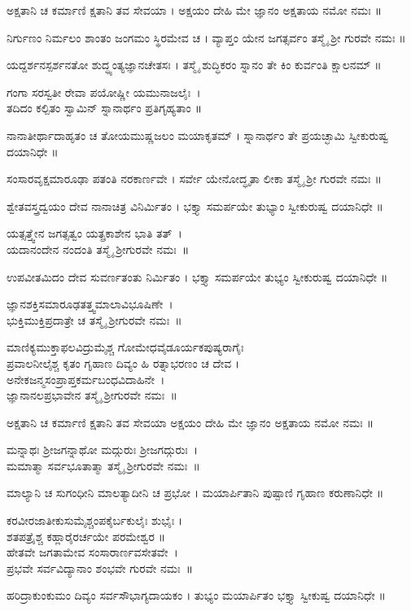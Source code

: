 ಅಕ್ಷತಾನಿ ಚ ಕರ್ಮಾಣಿ ಕ್ಷತಾನಿ ತವ ಸೇವಯಾ ।
ಅಕ್ಷಯಂ ದೇಹಿ ಮೇ ಜ್ಞಾನಂ ಅಕ್ಷತಾಯ ನಮೋ ನಮಃ ॥

ನಿರ್ಗುಣಂ ನಿರ್ಮಲಂ ಶಾಂತಂ ಜಂಗಮಂ ಸ್ಥಿರಮೇವ ಚ ।
ವ್ಯಾಪ್ತಂ ಯೇನ ಜಗತ್ಸರ್ವಂ ತಸ್ಮೈ ಶ್ರೀ ಗುರವೇ ನಮಃ ॥

ಯದ್ದರ್ಶನಸ್ಪರ್ಶನತೋ ಶುದ್ಧ್ಯಂತ್ಯಜ್ಞಾನಚೇತಸಃ ।
ತಸ್ಮೈ ಶುದ್ಧಿಕರಂ ಸ್ನಾನಂ ತೇ ಕಿಂ ಕುರ್ವಂತಿ ಕ್ಷಾಲನಮ್ ॥

ಗಂಗಾ ಸರಸ್ವತೀ ರೇವಾ ಪಯೋಷ್ಣೀ ಯಮುನಾಜಲೈಃ~।\\
ತದಿದಂ ಕಲ್ಪಿತಂ ಸ್ವಾಮಿನ್ ಸ್ನಾನಾರ್ಥಂ ಪ್ರತಿಗೃಹ್ಯತಾಂ ॥

ನಾನಾತೀರ್ಥಾದಾಹೃತಂ ಚ ತೋಯಮುಷ್ಣಜಲಂ ಮಯಾಕೃತಮ್ ।
ಸ್ನಾನಾರ್ಥಂ ತೇ ಪ್ರಯಚ್ಛಾಮಿ ಸ್ವೀಕುರುಷ್ವ ದಯಾನಿಧೇ ॥

ಸಂಸಾರವೃಕ್ಷಮಾರೂಢಾ ಪತಂತಿ ನರಕಾರ್ಣವೇ ।
ಸರ್ವೇ ಯೇನೋದ್ಧೃತಾ ಲೀಕಾ ತಸ್ಮೈ ಶ್ರೀ ಗುರವೇ ನಮಃ ॥

ಶ್ವೇತವಸ್ತ್ರದ್ವಯಂ ದೇವ ನಾನಾಚಿತ್ರ ವಿನಿರ್ಮಿತಂ ।
ಭಕ್ತ್ಯಾ ಸಮರ್ಪಯೇ ತುಭ್ಯಾಂ ಸ್ವೀಕುರುಷ್ವ ದಯಾನಿಧೇ ॥

ಯತ್ಸತ್ತ್ವೇನ ಜಗತ್ಸತ್ವಂ ಯತ್ಪ್ರಕಾಶೇನ ಭಾತಿ ತತ್~।\\
ಯದಾನಂದೇನ ನಂದಂತಿ ತಸ್ಮೈ ಶ್ರೀಗುರವೇ ನಮಃ~॥

ಉಪವೀತಮಿದಂ ದೇವ ಸುವರ್ಣತಂತು ನಿರ್ಮಿತಂ ।
ಭಕ್ತ್ಯಾ ಸಮರ್ಪಯೇ ತುಭ್ಯಂ ಸ್ವೀಕುರುಷ್ವ ದಯಾನಿಧೇ ॥

ಜ್ಞಾನಶಕ್ತಿಸಮಾರೂಢತತ್ತ್ವಮಾಲಾವಿಭೂಷಿಣೇ~।\\
ಭುಕ್ತಿಮುಕ್ತಿಪ್ರದಾತ್ರೇ ಚ ತಸ್ಮೈ ಶ್ರೀಗುರವೇ ನಮಃ~॥

ಮಾಣಿಕ್ಯಮುಕ್ತಾಫಲವಿದ್ರುಮೈಶ್ಚ ಗೋಮೇಧವೈಡೂರ್ಯಕಪುಷ್ಯರಾಗೈಃ\\
ಪ್ರವಾಲನೀಲೈಶ್ಚ ಕೃತಂ ಗೃಹಾಣ ದಿವ್ಯಂ ಹಿ ರತ್ನಾಭರಣಂ ಚ ದೇವ ।\\

ಅನೇಕಜನ್ಮಸಂಪ್ರಾಪ್ತಕರ್ಮಬಂಧವಿದಾಹಿನೇ~।\\
ಜ್ಞಾನಾನಲಪ್ರಭಾವೇನ ತಸ್ಮೈ ಶ್ರೀಗುರವೇ ನಮಃ~॥


ಅಕ್ಷತಾನಿ ಚ ಕರ್ಮಾಣಿ ಕ್ಷತಾನಿ ತವ ಸೇವಯಾ 
ಅಕ್ಷಯಂ ದೇಹಿ ಮೇ ಜ್ಞಾನಂ ಅಕ್ಷತಾಯ ನಮೋ ನಮಃ ॥

ಮನ್ನಾಥಃ ಶ್ರೀಜಗನ್ನಾಥೋ ಮದ್ಗುರುಃ ಶ್ರೀಜಗದ್ಗುರುಃ~।\\
ಮಮಾತ್ಮಾ ಸರ್ವಭೂತಾತ್ಮಾ ತಸ್ಮೈ ಶ್ರೀಗುರವೇ ನಮಃ~॥


ಮಾಲ್ಯಾನಿ ಚ ಸುಗಂಧೀನಿ ಮಾಲತ್ಯಾದೀನಿ ಚ ಪ್ರಭೋ ।
ಮಯಾರ್ಪಿತಾನಿ ಪುಷ್ಪಾಣಿ ಗೃಹಾಣ ಕರುಣಾನಿಧೇ ॥


ಕರವೀರಜಾತೀಕುಸುಮೈಶ್ಚಂಪಕೈರ್ಬಕುಲೈಃ ಶುಭೈಃ ।\\
ಶತಪತ್ರೈಶ್ಚ ಕಹ್ಲಾರೈರರ್ಚಯೇ ಪರಮೇಶ್ವರ ॥\\

ಹೇತವೇ ಜಗತಾಮೇವ ಸಂಸಾರಾರ್ಣವಸೇತವೇ~।\\
ಪ್ರಭವೇ ಸರ್ವವಿದ್ಯಾನಾಂ ಶಂಭವೇ ಗುರವೇ ನಮಃ~॥

ಹರಿದ್ರಾಕುಂಕುಮಂ ದಿವ್ಯಂ ಸರ್ವಸೌಭಾಗ್ಯದಾಯಕಂ ।
ತುಭ್ಯಂ ಮಯಾರ್ಪಿತಂ  ಭಕ್ತ್ಯಾ ಸ್ವೀಕುಷ್ವ ದಯಾನಿಧೇ ॥

